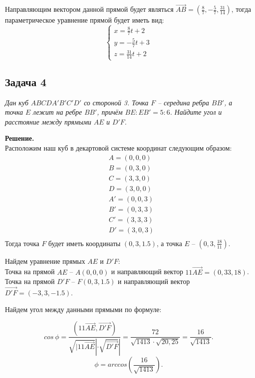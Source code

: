 	Направляющим вектором данной прямой будет являться $\overrightarrow{AB} = (\frac{8}{7}, -\frac{5}{7}, \frac{31}{14})$, тогда параметрическое уравнение прямой будет иметь вид: 
	\[
		\begin{cases}
			x = \frac{8}{7}t + 2 \\
			y = -\frac{5}{7}t + 3 \\
			z = \frac{31}{14}t + 2
		\end{cases}
	\]
	
	
	\subsection{Задача 4} 
	\textit{Дан куб $ABCDA'B'C'D'$ со стороной 3. Точка $F$ -- середина ребра $BB'$, а точка $E$ лежит на ребре $BB'$, причём $BE : EB' = 5 : 6$. Найдите угол и расстояние между прямыми $AE$ и $D'F$.}
	
	\textbf{Решение.}\\
	Расположим наш куб в декартовой системе координат следующим образом:
	\begin{align*}
		&A = (0,0,0) \\
		&B = (0,3,0) \\
		&C = (3,3,0) \\
		&D = (3,0,0) \\
		&A' = (0,0,3) \\
		&B' = (0,3,3) \\
		&C' = (3,3,3) \\
		&D' = (3,0,3) \\
	\end{align*}
	Тогда точка $F$ будет иметь координаты $(0, 3, 1.5)$, а точка $E$ -- $(0, 3, \frac{18}{11})$.
	
	Найдем уравнение прямых $AE$ и $D'F$:\\
	Точка на прямой $AE$ -- $A(0,0,0)$ и направляющий вектор $11\overrightarrow{AE} = (0,33,18)$.
	Точка на прямой $D'F$ -- $F(0, 3, 1.5)$ и направляющий вектор $\overrightarrow{D'F} = (-3,3,-1.5)$.
	
	Найдем угол между данными прямыми по формуле: 
	
	\[
		cos\ \phi = \frac{(11\overrightarrow{AE}, \overrightarrow{D'F})}{\sqrt{|11\overrightarrow{AE}}| \cdot \sqrt{\overrightarrow{D'F}}|} = \frac{72}{\sqrt{1413}\cdot \sqrt{20,25}} = \frac{16}{\sqrt{1413}}.
	\]
	\[
		\phi = arccos\left(\frac{16}{\sqrt{1413}}\right).
	\]
	

